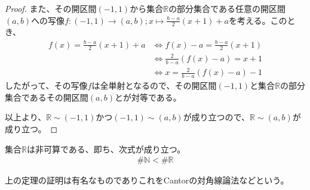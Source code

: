 \documentclass[dvipdfmx]{jsarticle}
\begin{document}
\begin{proof}
また、その開区間$( - 1,1)$から集合$\mathbb{R}$の部分集合である任意の開区間$(a,b)$への写像$f:( - 1,1) \rightarrow (a,b);x \mapsto \frac{b - a}{2}(x + 1) + a$を考える。このとき、
\begin{align*}
f(x) = \frac{b - a}{2}(x + 1) + a &\Leftrightarrow f(x) - a = \frac{b - a}{2}(x + 1)\\
&\Leftrightarrow \frac{2}{b - a}\left( f(x) - a \right) = x + 1\\
&\Leftrightarrow x = \frac{2}{b - a}\left( f(x) - a \right) - 1
\end{align*}
したがって、その写像$f$は全単射となるので、その開区間$( - 1,1)$と集合$\mathbb{R}$の部分集合であるその開区間$(a,b)$とが対等である。\par
以上より、$\mathbb{R} \sim ( - 1,1)$かつ$( - 1,1) \sim (a,b)$が成り立つので、$\mathbb{R} \sim (a,b)$が成り立つ。
\end{proof}
\begin{thm}\label{1.2.7.10}
  集合$\mathbb{R}$は非可算である、即ち、次式が成り立つ。
  \begin{align*}
  \# \mathbb{N} < \# \mathbb{R}
  \end{align*}
\end{thm}\par
上の定理の証明は有名なものでありこれをCantorの対角線論法などという。
\end{document}
